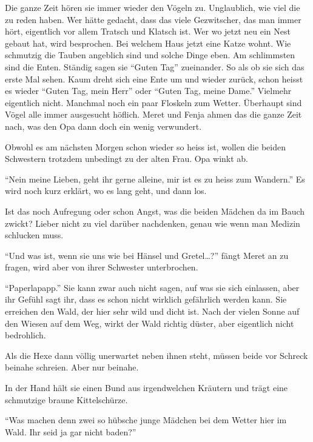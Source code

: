 Die ganze Zeit hören sie immer wieder den Vögeln zu. Unglaublich, wie viel die zu reden haben. Wer hätte gedacht, dass das viele Gezwitscher, das man immer hört, eigentlich vor allem Tratsch und Klatsch ist. Wer wo jetzt neu ein Nest gebaut hat, wird besprochen. Bei welchem Haus jetzt eine Katze wohnt. Wie schmutzig die Tauben angeblich sind und solche Dinge eben. Am schlimmsten sind die Enten. Ständig sagen sie \enquote{Guten Tag} zueinander. So als ob sie sich das erste Mal sehen. Kaum dreht sich eine Ente um und wieder zurück, schon heisst es wieder \enquote{Guten Tag, mein Herr} oder \enquote{Guten Tag, meine Dame.} Vielmehr eigentlich nicht. Manchmal noch ein paar Floskeln zum Wetter. Überhaupt sind Vögel alle immer ausgesucht höflich. Meret und Fenja ahmen das die ganze Zeit nach, was den Opa dann doch ein wenig verwundert.

\begin{center}
\aldineleft
\end{center}

Obwohl es am nächsten Morgen schon wieder so heiss ist, wollen die beiden Schwestern trotzdem unbedingt zu der alten Frau. Opa winkt ab.

\enquote{Nein meine Lieben, geht ihr gerne alleine, mir ist es zu heiss zum Wandern.} Es wird noch kurz erklärt, wo es lang geht, und dann los.

Ist das noch Aufregung oder schon Angst, was die beiden Mädchen da im Bauch zwickt? Lieber nicht zu viel darüber nachdenken, genau wie wenn man Medizin schlucken muss. 

\enquote{Und was ist, wenn sie uns wie bei Hänsel und Gretel\dots?} fängt Meret an zu fragen, wird aber von ihrer Schwester unterbrochen.

\enquote{Paperlapapp.} Sie kann zwar auch nicht sagen, auf was sie sich einlassen, aber ihr Gefühl sagt ihr, dass es schon nicht wirklich gefährlich werden kann. Sie erreichen den Wald, der hier sehr wild und dicht ist. Nach der vielen Sonne auf den Wiesen auf dem Weg, wirkt der Wald richtig düster, aber eigentlich nicht bedrohlich.

Als die Hexe dann völlig unerwartet neben ihnen steht, müssen beide vor Schreck beinahe schreien. Aber nur beinahe. 

In der Hand hält sie einen Bund aus irgendwelchen Kräutern und trägt eine schmutzige braune Kittelschürze.

\enquote{Was machen denn zwei so hübsche junge Mädchen bei dem Wetter hier im Wald. Ihr seid ja gar nicht baden?}


